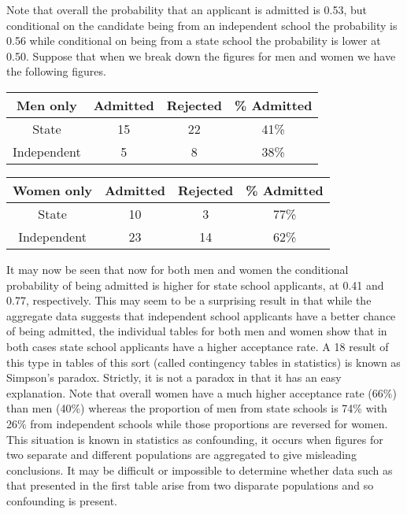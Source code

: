 \begin{example}
Note that overall the probability that an applicant is admitted is 0.53, but conditional on the candidate being from an independent school the probability is 0.56 while conditional on being from a state school the probability is lower at 0.50. Suppose that when we break down the figures for men and women we have the following figures.
\begin{center}
\begin{tabular}{cccc}
\quad Men only\quad & \quad Admitted\quad & \quad Rejected \quad &\quad \% Admitted \quad\\
\hline
State & 15 & 22 & 41\%\\
Independent & 5 & 8 & 38\%\\
\end{tabular}
\end{center}
\begin{center}
\begin{tabular}{cccc}
\quad Women only \quad & \quad Admitted\quad & \quad Rejected \quad &\quad \% Admitted \quad\\
\hline
State & 10 & 3 & 77\%\\
Independent & 23 & 14 & 62\%\\
\end{tabular}
\end{center}
It may now be seen that now for both men and women the conditional probability of being admitted is higher for state school applicants, at 0.41 and 0.77, respectively. This may seem to be a surprising result in that while the aggregate data suggests that independent school applicants have a better chance of being admitted, the individual tables for both men and women show that in both cases state school applicants have a higher acceptance rate. A 18 result of this type in tables of this sort (called contingency tables in statistics) is known as Simpson's paradox. Strictly, it is not a paradox in that it has an easy explanation. Note that overall women have a much higher acceptance rate (66\%) than men (40\%) whereas the proportion of men from state schools is 74\% with 26\% from independent schools while those proportions are reversed for women. This situation is known in statistics as confounding, it occurs when figures for two separate and different populations are aggregated to give misleading conclusions. It may be difficult or impossible to determine whether data such as that presented in the first table arise from two disparate populations and so confounding is present.


\end{example}
